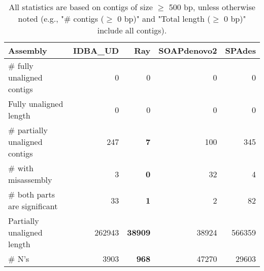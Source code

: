 \documentclass[12pt,a4paper]{article}
\begin{document}
\begin{table}[ht]
\begin{center}
\caption{All statistics are based on contigs of size $\geq$ 500 bp, unless otherwise noted (e.g., "\# contigs ($\geq$ 0 bp)" and "Total length ($\geq$ 0 bp)" include all contigs).}
\begin{tabular}{|l*{4}{|r}|}
\hline
Assembly & IDBA\_UD & Ray & SOAPdenovo2 & SPAdes \\ \hline
\# fully unaligned contigs & 0 & 0 & 0 & 0 \\ \hline
Fully unaligned length & 0 & 0 & 0 & 0 \\ \hline
\# partially unaligned contigs & 247 & {\bf 7} & 100 & 345 \\ \hline
\hspace{5mm}\# with misassembly & 3 & {\bf 0} & 32 & 4 \\ \hline
\hspace{5mm}\# both parts are significant & 33 & {\bf 1} & 2 & 82 \\ \hline
Partially unaligned length & 262943 & {\bf 38909} & 38924 & 566359 \\ \hline
\# N's & 3903 & {\bf 968} & 47270 & 29603 \\ \hline
\end{tabular}
\end{center}
\end{table}
\end{document}
